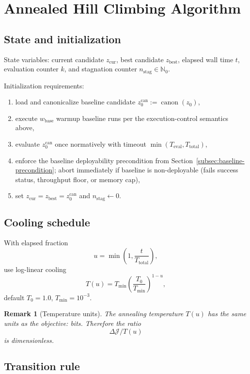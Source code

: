 \documentclass[11pt]{article}
\newtheorem{remark}{Remark}
\begin{document}
\section{Annealed Hill Climbing Algorithm}\label{sec:ahc-runtime}

\subsection{State and initialization}

State variables: current candidate $z_{\mathrm{cur}}$, best candidate
$z_{\mathrm{best}}$, elapsed wall time $t$, evaluation counter $k$, and
stagnation counter $n_{\mathrm{stag}}\in\mathbb{N}_0$.

Initialization requirements:
\begin{enumerate}
    \item load and canonicalize baseline candidate $z_0^{\mathrm{can}}:=\operatorname{canon}(z_0)$,
    \item execute $w_{\mathrm{base}}$ warmup baseline runs per the execution-control semantics above,
    \item evaluate $z_0^{\mathrm{can}}$ once normatively with timeout $\min(T_{\mathrm{eval}},T_{\mathrm{total}})$,
    \item enforce the baseline deployability precondition from
    Section~\ref{subsec:baseline-precondition}; abort immediately if baseline
    is non-deployable (fails success status, throughput floor, or memory cap),
    \item set $z_{\mathrm{cur}}=z_{\mathrm{best}}=z_0^{\mathrm{can}}$ and $n_{\mathrm{stag}}\leftarrow 0$.
\end{enumerate}

\subsection{Cooling schedule}

With elapsed fraction
\[
u=\min\!\left(1,\frac{t}{T_{\mathrm{total}}}\right),
\]
use log-linear cooling
\[
T(u)=T_{\min}\left(\frac{T_0}{T_{\min}}\right)^{1-u},
\]
default $T_0=1.0$, $T_{\min}=10^{-3}$.

\begin{remark}[Temperature units]
The annealing temperature $T(u)$ has the same units as the objective:
bits. Therefore the ratio
\[
\Delta\mathcal{J}/T(u)
\]
is dimensionless.
\end{remark}

\subsection{Transition rule}
\end{document}

